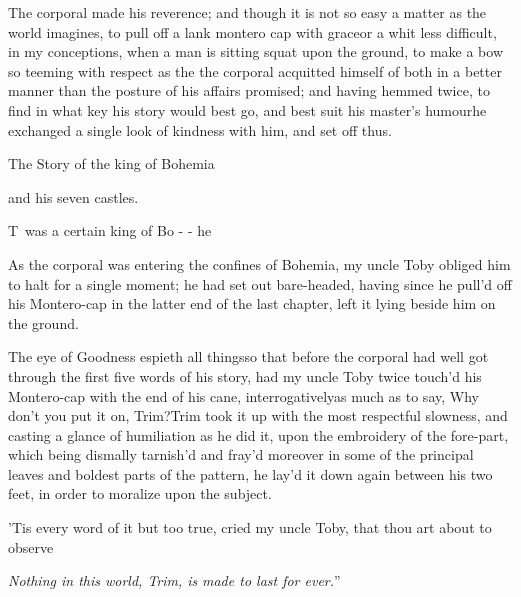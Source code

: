 \documentclass{article}
\begin{document}
The corporal made his reverence;\break
and though it is not so easy a
matter as the world imagines, to pull off a lank montero cap
with grace\tsk or a whit less difficult, in my
conceptions, when a man is sitting squat upon the ground, to make
a bow so teeming with respect as the 
\tsh the corporal acquitted himself of both in a
better manner than the posture of his affairs promised; and having
hemmed twice, to find in what key his story would best go, and best
suit his master’s humour\tsk he exchanged a single
look of kindness with him, and set off thus.\etp{}

\null\smallskip
\centerline{The Story of the king of Bohemia}
\centerline{and his seven castles.}

\lettrine{T}{\,} was a certain king of\break
Bo - - he\tsh

As the corporal was entering the confines of Bohemia, my
uncle Toby obliged him to halt for a single moment; he had
set out bare-headed, having since he pull’d off his
Montero-cap in the latter end of the last chapter, left it
lying beside him on the ground.

\tsh The eye of Goodness espieth all things\tsh so that before the corporal had
well got through the first five words of his story, had my uncle Toby twice
touch’d his Montero-cap with the end of his cane, interrogatively\tsh as much as to
say, Why don’t you put it on, Trim?\break Trim took it up with the most respectful
slowness, and casting a glance of humiliation as he did it, upon the embroidery of
the fore-part, which being dismally tarnish’d and fray’d moreover in some of the
principal leaves and boldest parts of the pattern, he lay’d it down again between
his two feet, in order to moralize upon the subject.

\tsh ’Tis every word of it but too true, cried my
uncle Toby, that thou art about to observe\tsh{}

\lqq\textit{Nothing in this world, Trim, is}\break
\lqq\textit{made to last for ever.}”
\end{document}
